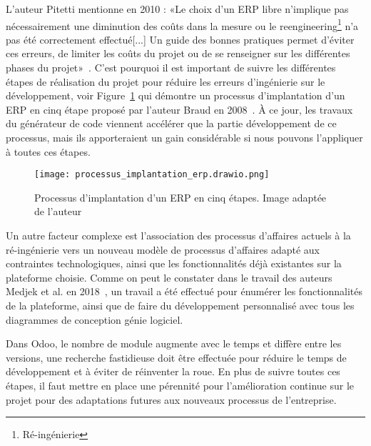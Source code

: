 L'auteur Pitetti mentionne en 2010 : «Le choix d’un ERP libre n’implique pas nécessairement une diminution des coûts dans la mesure ou le reengineering\footnote{Ré-ingénierie} n’a pas été correctement effectué[...] Un guide des bonnes pratiques permet d’éviter ces erreurs, de limiter les coûts du projet ou de se renseigner sur les différentes phases du projet»~\cite{pitetti2010implementation}. C'est pourquoi il est important de suivre les différentes étapes de réalisation du projet pour réduire les erreurs d'ingénierie sur le développement, voir Figure~\ref{fig:erp_implantation_cinq_etape} qui démontre un processus d'implantation d'un ERP en cinq étape proposé par l'auteur Braud en 2008~\cite{uqam_erp_benefice_2008}. À ce jour, les travaux du générateur de code viennent accélérer que la partie développement de ce processus, mais ils apporteraient un gain considérable si nous pouvons l'appliquer à toutes ces étapes.

\begin{figure}[htb]
\centering
\texttt{[image: processus\_implantation\_erp.drawio.png]}
\caption{Processus d'implantation d'un ERP en cinq étapes. Image adaptée de l'auteur~\cite{uqam_erp_benefice_2008}}
\label{fig:erp_implantation_cinq_etape}
\end{figure}


Un autre facteur complexe est l'association des processus d'affaires actuels à la ré-ingénierie vers un nouveau modèle de processus d'affaires adapté aux contraintes technologiques, ainsi que les fonctionnalités déjà existantes sur la plateforme choisie. Comme on peut le constater dans le travail des auteurs Medjek et al. en 2018~\cite{kenza2018conception}, un travail a été effectué pour énumérer les fonctionnalités de la plateforme, ainsi que de faire du développement personnalisé avec tous les diagrammes de conception génie logiciel.

Dans Odoo, le nombre de module augmente avec le temps et diffère entre les versions, une recherche fastidieuse doit être effectuée pour réduire le temps de développement et à éviter de réinventer la roue. En plus de suivre toutes ces étapes, il faut mettre en place une pérennité pour l’amélioration continue sur le projet pour des adaptations futures aux nouveaux processus de l'entreprise.



